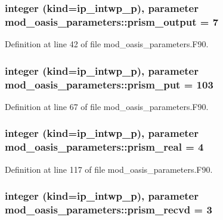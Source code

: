 \hypertarget{classmod__oasis__parameters_adc510873316710fd71696fabcc34f336}{
\subsubsection[{prism\+\_\+output}]{\setlength{\rightskip}{0pt plus 5cm}integer (kind=ip\+\_\+intwp\+\_\+p), parameter mod\+\_\+oasis\+\_\+parameters\+::prism\+\_\+output = 7}}\label{classmod__oasis__parameters_adc510873316710fd71696fabcc34f336}


Definition at line 42 of file mod\+\_\+oasis\+\_\+parameters.\+F90.

\hypertarget{classmod__oasis__parameters_ad8db79b2d411e8f04445dcc2ed619548}{
\subsubsection[{prism\+\_\+put}]{\setlength{\rightskip}{0pt plus 5cm}integer (kind=ip\+\_\+intwp\+\_\+p), parameter mod\+\_\+oasis\+\_\+parameters\+::prism\+\_\+put = 103}}\label{classmod__oasis__parameters_ad8db79b2d411e8f04445dcc2ed619548}


Definition at line 67 of file mod\+\_\+oasis\+\_\+parameters.\+F90.

\hypertarget{classmod__oasis__parameters_a02e0627219e7769df37e3d55da46f65d}{
\subsubsection[{prism\+\_\+real}]{\setlength{\rightskip}{0pt plus 5cm}integer (kind=ip\+\_\+intwp\+\_\+p), parameter mod\+\_\+oasis\+\_\+parameters\+::prism\+\_\+real = 4}}\label{classmod__oasis__parameters_a02e0627219e7769df37e3d55da46f65d}


Definition at line 117 of file mod\+\_\+oasis\+\_\+parameters.\+F90.

\hypertarget{classmod__oasis__parameters_aa0bc3b208a1f962e5ec08916b36cae2d}{
\subsubsection[{prism\+\_\+recvd}]{\setlength{\rightskip}{0pt plus 5cm}integer (kind=ip\+\_\+intwp\+\_\+p), parameter mod\+\_\+oasis\+\_\+parameters\+::prism\+\_\+recvd = 3}}\label{classmod__oasis__parameters_aa0bc3b208a1f962e5ec08916b36cae2d}


